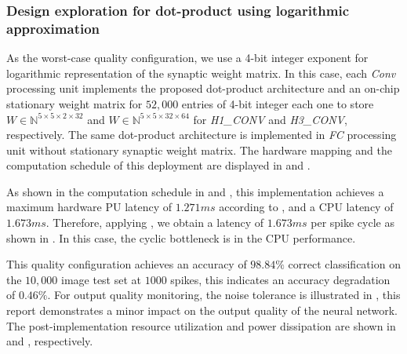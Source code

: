 \subsubsection{Design exploration for dot-product using logarithmic approximation}
As the worst-case quality configuration, we use a 4-bit integer exponent for logarithmic representation of the synaptic weight matrix. In this case, each \emph{Conv} processing unit implements the proposed dot-product architecture and an on-chip stationary weight matrix for $52,000$ entries of 4-bit integer each one to store $W\in\mathbb{N}^{5\times 5\times 2\times 32}$ and $W\in\mathbb{N}^{5\times 5\times 32\times 64}$ for \emph{H1\_CONV} and \emph{H3\_CONV}, respectively. The same dot-product architecture is implemented in \emph{FC} processing unit without stationary synaptic weight matrix. The hardware mapping and the computation schedule of this deployment are displayed in  and .

As shown in the computation schedule in  and , this implementation achieves a maximum hardware PU latency of $1.271 ms$ according to , and a CPU latency of $1.673 ms$. Therefore, applying , we obtain a latency of $1.673 ms$ per spike cycle as shown in . In this case, the cyclic bottleneck is in the CPU performance.

This quality configuration achieves an accuracy of $98.84\%$ correct classification on the $10,000$ image test set at $1000$ spikes, this indicates an accuracy degradation of $0.46\%$. For output quality monitoring, the noise tolerance is illustrated in , this report demonstrates a minor impact on the output quality of the neural network. The post-implementation resource utilization and power dissipation are shown in  and , respectively.

